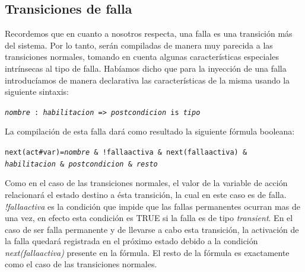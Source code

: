 \documentclass[pdftex,a4paper,12pt]{book}
\newcommand{\textff}[1]{\begin{center}\texttt{#1}\end{center}}
\newcommand{\etextit}[1]{\textnormal{\textit{#1}}}
\begin{document}
\subsection*{Transiciones de falla}
Recordemos que en cuanto a nosotros respecta, una falla es una transici\'on m\'as del sistema. Por lo tanto, ser\'an compiladas de manera muy parecida a las transiciones normales, tomando en cuenta algunas caracter\'isticas especiales intr\'insecas al tipo de falla. Hab\'iamos dicho que para la inyecci\'on de una falla introduc\'iamos de manera declarativa las caracter\'isticas de la misma usando la siguiente sintaxis:
\textff{\etextit{nombre}~:~\etextit{habilitacion}~=>~\etextit{postcondicion}~is~\etextit{tipo}}
La compilaci\'on de esta falla dar\'a como resultado la siguiente f\'ormula booleana:
\textff{next(act\#var)=\etextit{nombre}~\&~!fallaactiva~\&~next(fallaactiva)~\& \\\etextit{habilitacion}~\&~\etextit{postcondicion}~\&~\etextit{resto}}
Como en el caso de las transiciones normales, el valor de la variable de acci\'on relacionar\'a el estado destino a \'esta transici\'on, la cual en este caso es de falla. \textit{!fallaactiva} es la condici\'on que impide que las fallas permanentes ocurran mas de una vez, en efecto esta condici\'on es TRUE si la falla es de tipo \textit{transient}. En el caso de ser falla permanente y de llevarse a cabo esta transici\'on, la activaci\'on de la falla quedar\'a registrada en el pr\'oximo estado debido a la condici\'on \textit{next(fallaactiva)} presente en la f\'ormula. El resto de la f\'ormula es exactamente como el caso de las transiciones normales.
\end{document}
